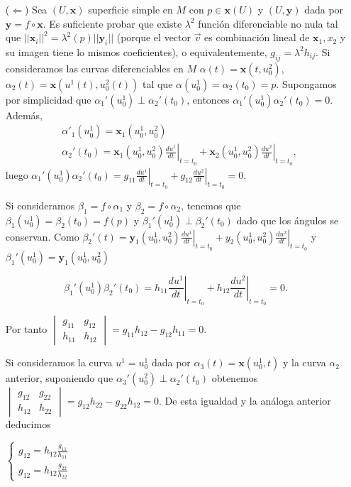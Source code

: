 \documentclass[twoside]{article}
\newcommand{\x}{{\mathbf{x}}}
\newcommand{\y}{{\mathbf{y}}}
\begin{document}
\begin{solucion}
\begin{itemize}
\item[($\Leftarrow$)] Sea $(U,\x)$ superficie simple en $M$ con $p \in \x(U)$ y $(U,\y)$ dada por $\y = f \circ \x$. Es suficiente probar que existe $λ^2$ función diferenciable no nula tal que $||\x_i||^2 = λ^2(p) ||\y_i||$ (porque el vector $\vec{v}$ es combinación lineal de $\x_1,x_2$ y su imagen tiene lo mismos coeficientes), o equivalentemente, $g_{ij}= λ^2 h_{ij}$. Si consideramos las curvas diferenciables en $M$ $α(t)=\x(t,u^2_0)$, $α_2(t)=\x(u^1(t),u_0^2(t))$  tal que $α(u_0^1)=α_2(t_0)=p$. Supongamos por simplicidad que $\alpha_1'(u_0^1)\perp\alpha_2'(t_0)$, entonces $\alpha_1'(u_0^1)\alpha_2'(t_0)=0$. Además,
\begin{align*}
&\alpha'_1(u_0^1)=\x_1(u_0^1,u_0^2)\\
&\alpha_2'(t_0)=\x_1(u^1_0,u^2_0)\left.\frac{du^1}{dt}\right|_{t=t_0}+\x_2(u^1_0,u^2_0)\left.\frac{du^2}{dt}\right|_{t=t_0},
\end{align*}
luego $\alpha_1'(u_0^1)\alpha_2'(t_0)=g_{11}\left.\frac{du^1}{dt}\right|_{t=t_0}+g_{12}\left.\frac{du^2}{dt}\right|_{t=t_0}=0$. 

Si consideramos $\beta_1=f\circ\alpha_1$ y $\beta_2=f\circ\alpha_2$, tenemos que $\beta_1(u^1_0)=\beta_2(t_0)=f(p)$ y $\beta_1'(u^1_0)\perp \beta_2'(t_0)$ dado que los ángulos se conservan. Como $\beta_2'(t)=\y_1(u^1_0,u^2_0)\left.\frac{du^1}{dt}\right|_{t=t_0}+y_2(u^1_0,u^2_0)\left.\frac{du^2}{dt}\right|_{t=t_0}$ y $\beta_1'(u^1_0)=\y_1(u^1_0,u^2_0)$

$$\beta_1'(u^1_0)\beta_2'(t_0)=h_{11}\left.\frac{du^1}{dt}\right|_{t=t_0}+h_{12}\left.\frac{du^2}{dt}\right|_{t=t_0}=0.$$

Por tanto $\begin{vmatrix}
g_{11} & g_{12}\\
h_{11} & h_{12}
\end{vmatrix}=g_{11}h_{12}-g_{12}h_{11}=0$.

Si consideramos la curva $u^1=u^1_0$ dada por $\alpha_3(t)=\x(u_0^1,t)$ y la curva $\alpha_2$ anterior, suponiendo que $\alpha_3'(u^2_0)\perp\alpha_2'(t_0)$ obtenemos $\begin{vmatrix}
g_{12} & g_{22}\\
h_{12} & h_{22}
\end{vmatrix}=g_{12}h_{22}-g_{22}h_{12}=0$. De esta igualdad y la análoga anterior deducimos

$\begin{cases}
g_{12}=h_{12}\frac{g_{11}}{h_{11}}\\
g_{12}=h_{12}\frac{g_{22}}{h_{22}}
\end{cases}$


\end{itemize}
\end{solucion}
\end{document}
